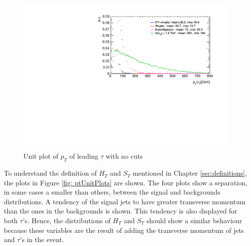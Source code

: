 \begin{figure}
\centering
\includegraphics[width=\linewidth]{Plots/tau1_pt_unitNC.pdf}
\caption{Unit plot of $p_{T}$ of leading $\tau$ with no cuts}
\label{fig: tau1ptunitNC}
\end{figure}

To understand the definition of $H_{T}$ and $S_{T}$ mentioned in Chapter \ref{sec:definitions}, the plots in Figure \ref{fig: ptUnitPlots} are shown. The four plots show a separation, in some cases a smaller than others, between the signal and backgrounds distributions. A tendency of the signal jets to have greater transverse momentum than the ones in the backgrounds is shown. This tendency is also displayed for both $\tau$'s. Hence, the distributions of $H_{T}$ and $S_{T}$ should show a similar behaviour because these variables are the result of adding the transverse momentum of jets and $\tau$'s in the event.

